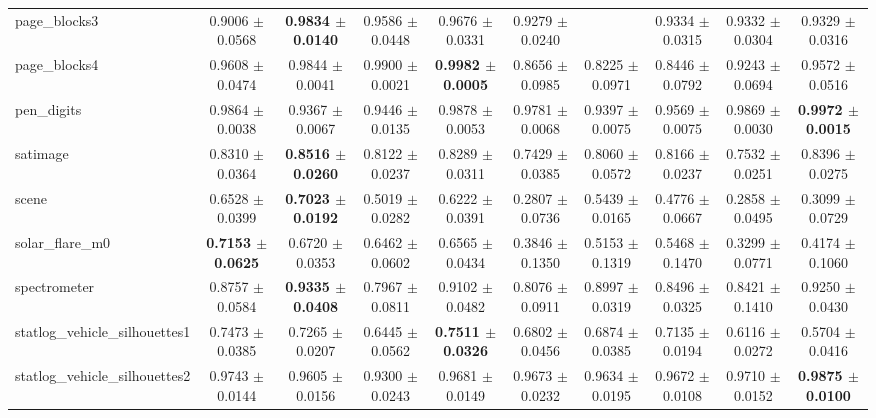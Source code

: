 \begin{table*}[htbp]
{\begin{tabular}{lccccccccc}
            page\_blocks3 & 0.9006 $\pm$ 0.0568 & \cellcolor{graybg}\textbf{0.9834 $\pm$ 0.0140} & 0.9586 $\pm$ 0.0448 & 0.9676 $\pm$ 0.0331 & 0.9279 $\pm$ 0.0240 &  & 0.9334 $\pm$ 0.0315 & 0.9332 $\pm$ 0.0304 & 0.9329 $\pm$ 0.0316 \\ 
            page\_blocks4 & 0.9608 $\pm$ 0.0474 & 0.9844 $\pm$ 0.0041 & 0.9900 $\pm$ 0.0021 & \cellcolor{graybg}\textbf{0.9982 $\pm$ 0.0005} & 0.8656 $\pm$ 0.0985 & 0.8225 $\pm$ 0.0971 & 0.8446 $\pm$ 0.0792 & 0.9243 $\pm$ 0.0694 & 0.9572 $\pm$ 0.0516 \\ 
            pen\_digits & 0.9864 $\pm$ 0.0038 & 0.9367 $\pm$ 0.0067 & 0.9446 $\pm$ 0.0135 & 0.9878 $\pm$ 0.0053 & 0.9781 $\pm$ 0.0068 & 0.9397 $\pm$ 0.0075 & 0.9569 $\pm$ 0.0075 & 0.9869 $\pm$ 0.0030 & \cellcolor{graybg}\textbf{0.9972 $\pm$ 0.0015} \\ 
            satimage & 0.8310 $\pm$ 0.0364 & \cellcolor{graybg}\textbf{0.8516 $\pm$ 0.0260} & 0.8122 $\pm$ 0.0237 & 0.8289 $\pm$ 0.0311 & 0.7429 $\pm$ 0.0385 & 0.8060 $\pm$ 0.0572 & 0.8166 $\pm$ 0.0237 & 0.7532 $\pm$ 0.0251 & 0.8396 $\pm$ 0.0275 \\ 
            scene & 0.6528 $\pm$ 0.0399 & \cellcolor{graybg}\textbf{0.7023 $\pm$ 0.0192} & 0.5019 $\pm$ 0.0282 & 0.6222 $\pm$ 0.0391 & 0.2807 $\pm$ 0.0736 & 0.5439 $\pm$ 0.0165 & 0.4776 $\pm$ 0.0667 & 0.2858 $\pm$ 0.0495 & 0.3099 $\pm$ 0.0729 \\ 
            solar\_flare\_m0 & \cellcolor{graybg}\textbf{0.7153 $\pm$ 0.0625} & 0.6720 $\pm$ 0.0353 & 0.6462 $\pm$ 0.0602 & 0.6565 $\pm$ 0.0434 & 0.3846 $\pm$ 0.1350 & 0.5153 $\pm$ 0.1319 & 0.5468 $\pm$ 0.1470 & 0.3299 $\pm$ 0.0771 & 0.4174 $\pm$ 0.1060 \\ 
            spectrometer & 0.8757 $\pm$ 0.0584 & \cellcolor{graybg}\textbf{0.9335 $\pm$ 0.0408} & 0.7967 $\pm$ 0.0811 & 0.9102 $\pm$ 0.0482 & 0.8076 $\pm$ 0.0911 & 0.8997 $\pm$ 0.0319 & 0.8496 $\pm$ 0.0325 & 0.8421 $\pm$ 0.1410 & 0.9250 $\pm$ 0.0430 \\ 
            statlog\_vehicle\_silhouettes1 & 0.7473 $\pm$ 0.0385 & 0.7265 $\pm$ 0.0207 & 0.6445 $\pm$ 0.0562 & \cellcolor{graybg}\textbf{0.7511 $\pm$ 0.0326} & 0.6802 $\pm$ 0.0456 & 0.6874 $\pm$ 0.0385 & 0.7135 $\pm$ 0.0194 & 0.6116 $\pm$ 0.0272 & 0.5704 $\pm$ 0.0416 \\ 
            statlog\_vehicle\_silhouettes2 & 0.9743 $\pm$ 0.0144 & 0.9605 $\pm$ 0.0156 & 0.9300 $\pm$ 0.0243 & 0.9681 $\pm$ 0.0149 & 0.9673 $\pm$ 0.0232 & 0.9634 $\pm$ 0.0195 & 0.9672 $\pm$ 0.0108 & 0.9710 $\pm$ 0.0152 & \cellcolor{graybg}\textbf{0.9875 $\pm$ 0.0100} \\ 

\end{tabular}}
\end{table*}
